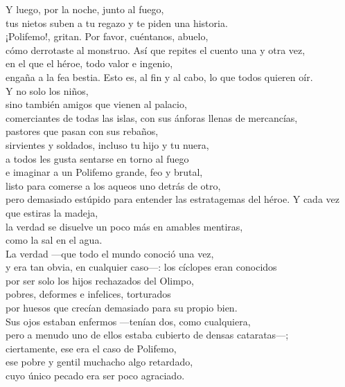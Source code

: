 \begin{versopropio}
Y luego, por la noche, junto al fuego,\\
tus nietos suben a tu regazo y te piden una historia.\\
¡Polifemo!, gritan. Por favor, cuéntanos, abuelo,\\
cómo derrotaste al monstruo.
\stanzabreak
Así que repites el cuento una y otra vez,\\
en el que el héroe, todo valor e ingenio,\\
engaña a la fea bestia.
\stanzabreak
Esto es, al fin y al cabo, lo que todos quieren oír.\\
Y no solo los niños,\\
sino también amigos que vienen al palacio,\\
comerciantes de todas las islas, con sus ánforas llenas de mercancías,\\
pastores que pasan con sus rebaños,\\
sirvientes y soldados, incluso tu hijo y tu nuera,\\
a todos les gusta sentarse en torno al fuego\\
e imaginar a un Polifemo grande, feo y brutal,\\
listo para comerse a los aqueos uno detrás de otro,\\
pero demasiado estúpido para entender las estratagemas del héroe.
\stanzabreak
Y cada vez que estiras la madeja,\\
la verdad se disuelve un poco más en amables mentiras,\\
como la sal en el agua.\\
La verdad ---que todo el mundo conoció una vez,\\
y era tan obvia, en cualquier caso---: los cíclopes eran conocidos\\
por ser solo los hijos rechazados del Olimpo,\\
pobres, deformes e infelices, torturados\\
por huesos que crecían demasiado para su propio bien.\\
Sus ojos estaban enfermos ---tenían dos, como cualquiera,\\
pero a menudo uno de ellos estaba cubierto de densas cataratas---;\\
ciertamente, ese era el caso de Polifemo,\\
ese pobre y gentil muchacho algo retardado,\\
cuyo único pecado era ser poco agraciado.
\end{versopropio}

